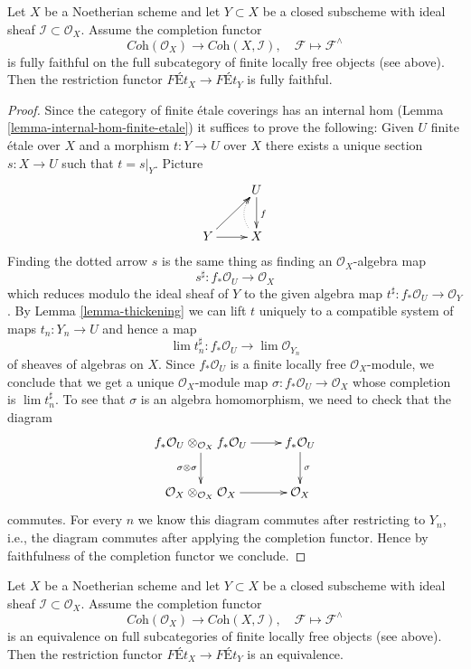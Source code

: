 \begin{lemma}
\label{lemma-restriction-fully-faithful}
Let $X$ be a Noetherian scheme and let $Y \subset X$ be a closed subscheme
with ideal sheaf $\mathcal{I} \subset \mathcal{O}_X$.
Assume the completion functor
$$
\textit{Coh}(\mathcal{O}_X)
\longrightarrow 
\textit{Coh}(X, \mathcal{I}),\quad
\mathcal{F} \longmapsto \mathcal{F}^\wedge
$$
is fully faithful on the full subcategory of finite locally free objects
(see above).
Then the restriction functor $\textit{F\'Et}_X \to \textit{F\'Et}_Y$
is fully faithful.
\end{lemma}

\begin{proof}
Since the category of finite \'etale coverings has an
internal hom (Lemma \ref{lemma-internal-hom-finite-etale})
it suffices to prove the following: Given $U$ finite \'etale over $X$
and a morphism $t : Y \to U$ over $X$ there exists a unique section
$s : X \to U$ such that $t = s|_Y$. Picture
$$
\xymatrix{
& U \ar[d]^f \\
Y \ar[r] \ar[ru] & X \ar@{..>}@/^1em/[u]
}
$$
Finding the dotted arrow $s$ is the same thing as finding an
$\mathcal{O}_X$-algebra map
$$
s^\sharp : f_*\mathcal{O}_U \longrightarrow \mathcal{O}_X
$$
which reduces modulo the ideal sheaf of $Y$ to the given algebra map
$t^\sharp : f_*\mathcal{O}_U \to \mathcal{O}_Y$.
By Lemma \ref{lemma-thickening} we can lift $t$ uniquely to a compatible
system of maps $t_n : Y_n \to U$ and hence a map
$$
\lim t_n^\sharp : f_*\mathcal{O}_U \longrightarrow \lim \mathcal{O}_{Y_n}
$$
of sheaves of algebras on $X$.
Since $f_*\mathcal{O}_U$ is a finite locally free $\mathcal{O}_X$-module,
we conclude that we get a unique $\mathcal{O}_X$-module map
$\sigma : f_*\mathcal{O}_U \to \mathcal{O}_X$ whose completion
is $\lim t_n^\sharp$. To see that $\sigma$ is an algebra homomorphism,
we need to check that the diagram
$$
\xymatrix{
f_*\mathcal{O}_U \otimes_{\mathcal{O}_X} f_*\mathcal{O}_U
\ar[r] \ar[d]_{\sigma \otimes \sigma} &
f_*\mathcal{O}_U \ar[d]^\sigma \\
\mathcal{O}_X \otimes_{\mathcal{O}_X} \mathcal{O}_X \ar[r] &
\mathcal{O}_X
}
$$
commutes. For every $n$ we know this diagram commutes after restricting
to $Y_n$, i.e., the diagram commutes after applying the completion functor.
Hence by faithfulness of the completion functor we conclude.
\end{proof}

\begin{lemma}
\label{lemma-restriction-equivalence}
Let $X$ be a Noetherian scheme and let $Y \subset X$ be a closed subscheme
with ideal sheaf $\mathcal{I} \subset \mathcal{O}_X$.
Assume the completion functor
$$
\textit{Coh}(\mathcal{O}_X)
\longrightarrow 
\textit{Coh}(X, \mathcal{I}),\quad
\mathcal{F} \longmapsto \mathcal{F}^\wedge
$$
is an equivalence on full subcategories of finite locally free objects
(see above).
Then the restriction functor $\textit{F\'Et}_X \to \textit{F\'Et}_Y$
is an equivalence.
\end{lemma}

